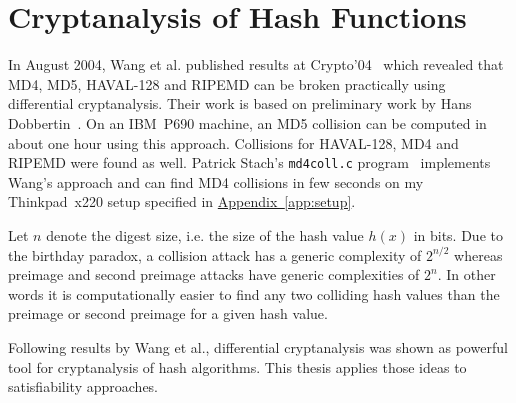 \section{Cryptanalysis of Hash Functions}
\label{sec:intro-cryptanalysis}
%
In August 2004, Wang et al. published results at Crypto'04~\cite{wang2004} which revealed
that MD4, MD5, HAVAL-128 and RIPEMD can be broken practically using differential cryptanalysis.
Their work is based on preliminary work by Hans Dobbertin~\cite{Dobbertin1998}.
On an IBM~P690 machine, an MD5 collision can be computed in about one hour using this approach.
Collisions for HAVAL-128, MD4 and RIPEMD were found as well. Patrick Stach's \texttt{md4coll.c}
program~\cite{md4coll} implements Wang's approach and can find MD4 collisions in few seconds
on my Thinkpad~x220 setup specified in \hyperref[app:setup]{Appendix~\ref{app:setup}}.

Let $n$ denote the digest size, i.e. the size of the hash value $h(x)$ in bits.
Due to the birthday paradox, a collision attack has a generic complexity of $2^{n/2}$
whereas preimage and second preimage attacks have generic complexities of $2^n$.
In other words it is computationally easier to find any two colliding hash values
than the preimage or second preimage for a given hash value.

Following results by Wang et al., differential cryptanalysis was shown as
powerful tool for cryptanalysis of hash algorithms. This thesis applies those
ideas to satisfiability approaches.

